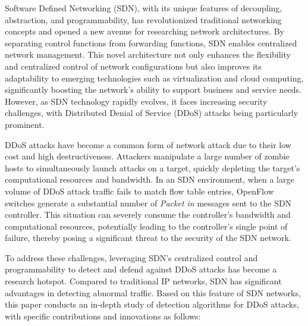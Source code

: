 \begin{abstract*}

  Software Defined Networking (SDN), with its unique features of decoupling, abstraction, and programmability, has revolutionized traditional networking concepts and opened a new avenue for researching network architectures. By separating control functions from forwarding functions, SDN enables centralized network management. This novel architecture not only enhances the flexibility and centralized control of network configurations but also improves its adaptability to emerging technologies such as virtualization and cloud computing, significantly boosting the network's ability to support business and service needs. However, as SDN technology rapidly evolves, it faces increasing security challenges, with Distributed Denial of Service (DDoS) attacks being particularly prominent.

 DDoS attacks have become a common form of network attack due to their low cost and high destructiveness. Attackers manipulate a large number of zombie hosts to simultaneously launch attacks on a target, quickly depleting the target's computational resources and bandwidth. In an SDN environment, when a large volume of DDoS attack traffic fails to match flow table entries, OpenFlow switches generate a substantial number of \textit{Packet in} messages sent to the SDN controller. This situation can severely consume the controller's bandwidth and computational resources, potentially leading to the controller's single point of failure, thereby posing a significant threat to the security of the SDN network.

 To address these challenges, leveraging SDN's centralized control and programmability to detect and defend against DDoS attacks has become a research hotspot. Compared to traditional IP networks, SDN has significant advantages in detecting abnormal traffic. Based on this feature of SDN networks, this paper conducts an in-depth study of detection algorithms for DDoS attacks, with specific contributions and innovations as follows:


\end{abstract*}
